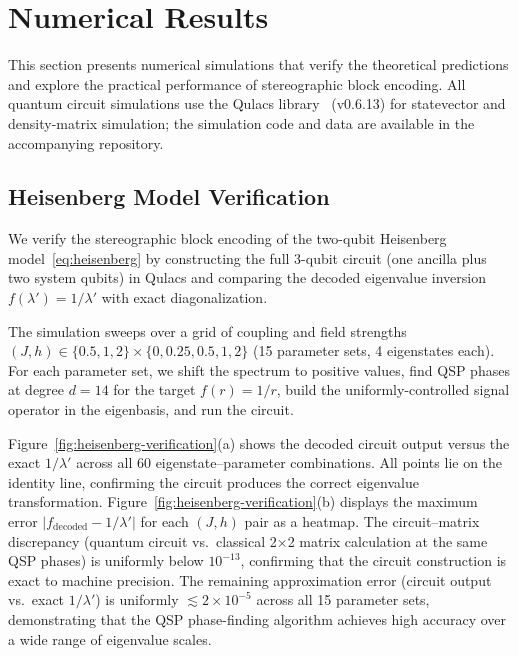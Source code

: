 \section{Numerical Results}
\label{sec:numerics}

This section presents numerical simulations that verify the
theoretical predictions and explore the practical performance of
stereographic block encoding.  All quantum circuit simulations
use the Qulacs library~\cite{Qulacs2021} (v0.6.13) for
statevector and density-matrix simulation; the
simulation code and data are available in the accompanying
repository.

\subsection{Heisenberg Model Verification}
\label{subsec:heisenberg-numerics}

We verify the stereographic block encoding of the two-qubit
Heisenberg model~\eqref{eq:heisenberg} by constructing the
full 3-qubit circuit (one ancilla plus two system qubits)
in Qulacs and comparing the decoded eigenvalue inversion
$f(\lambda') = 1/\lambda'$ with exact diagonalization.

The simulation sweeps over a grid of coupling and field
strengths $(J, h) \in \{0.5, 1, 2\} \times \{0, 0.25,
	0.5, 1, 2\}$ (15 parameter sets, 4 eigenstates each).
For each parameter set, we shift the spectrum to positive
values, find QSP phases at degree $d = 14$ for the target
$f(r) = 1/r$, build the uniformly-controlled signal
operator in the eigenbasis, and run the circuit.

Figure~\ref{fig:heisenberg-verification}(a) shows the
decoded circuit output versus the exact $1/\lambda'$ across
all 60 eigenstate--parameter combinations.  All points
lie on the identity line, confirming the circuit produces
the correct eigenvalue transformation.
Figure~\ref{fig:heisenberg-verification}(b) displays the
maximum error $|f_{\mathrm{decoded}} - 1/\lambda'|$ for
each $(J, h)$ pair as a heatmap.  The circuit--matrix
discrepancy (quantum circuit vs.\ classical 2$\times$2
matrix calculation at the same QSP phases) is uniformly
below $10^{-13}$, confirming that the circuit construction
is exact to machine precision.  The remaining approximation
error (circuit output vs.\ exact $1/\lambda'$) is uniformly
$\lesssim 2 \times 10^{-5}$ across all 15 parameter sets,
demonstrating that the QSP phase-finding algorithm achieves
high accuracy over a wide range of eigenvalue scales.

